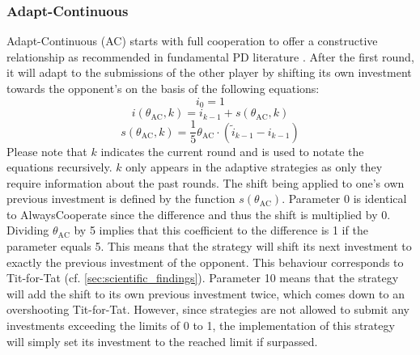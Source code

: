 \documentclass[11pt]{article}
\begin{document}
\subsubsection*{Adapt-Continuous}
Adapt-Continuous (AC) starts with full cooperation to offer a constructive relationship as recommended in fundamental PD literature \cite{RC15, Kuh25}.
After the first round, it will adapt to the submissions of the other player by shifting its own investment towards the opponent's on the basis of the following equations:
\begin{equation}
	i_0 = 1
	\label{eq:AC_i0}
\end{equation}
\begin{equation}
	i(\theta_{\mathrm{AC}}, k) = i_{k-1} + s(\theta_{\mathrm{AC}}, k)
	\label{eq:AC_i_eq}
\end{equation}
\begin{equation}
	s(\theta_{\mathrm{AC}}, k) = \frac{1}{5} \theta_{\mathrm{AC}} \cdot (\tilde{i}_{k-1} - i_{k-1})
	\label{eq:AC_s_eq}
\end{equation}
Please note that $k$ indicates the current round and is used to notate the equations recursively.
$k$ only appears in the adaptive strategies as only they require information about the past rounds.
The shift being applied to one's own previous investment is defined by the function $s(\theta_{\mathrm{AC}})$.
Parameter 0 is identical to AlwaysCooperate since the difference and thus the shift is multiplied by 0.
Dividing $\theta_{\mathrm{AC}}$ by 5 implies that this coefficient to the difference is 1 if the parameter equals 5.
This means that the strategy will shift its next investment to exactly the previous investment of the opponent.
This behaviour corresponds to Tit-for-Tat (cf. \ref{sec:scientific_findings}).
Parameter 10 means that the strategy will add the shift to its own previous investment twice, which comes down to an overshooting Tit-for-Tat.
However, since strategies are not allowed to submit any investments exceeding the limits of 0 to 1, the implementation of this strategy will simply set its investment to the reached limit if surpassed.
\end{document}
